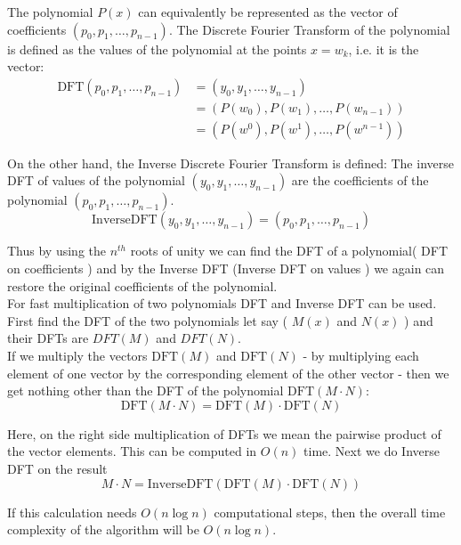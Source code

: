 \documentclass[28]{report}
\begin{document}
              The polynomial $P(x)$ can equivalently be represented as the vector of coefficients $(p_0, p_1, \dots, p_{n-1})$. The Discrete Fourier Transform of the polynomial is defined as the values of the polynomial at the points $x = w_{k}$, i.e. it is the vector: \\

                \begin{align*} \text{DFT}(p_0, p_1, \dots, p_{n-1}) &= (y_0, y_1, \dots, y_{n-1}) \\ &= (P(w_{0}), P(w_{1}), \dots, P(w_{n-1})) \\ &= (P(w^0), P(w^1), \dots, P(w^{n-1})) \end{align*}

            On the other hand,  the Inverse Discrete Fourier Transform is defined: The inverse DFT of values of the polynomial $(y_0, y_1, \dots, y_{n-1})$ are the coefficients of the polynomial $(p_0, p_1, \dots, p_{n-1})$.
            $$\text{InverseDFT}(y_0, y_1, \dots, y_{n-1}) = (p_0, p_1, \dots, p_{n-1})$$

            Thus by using the $n^{th}$ roots of unity we can find the DFT of a polynomial( DFT on coefficients ) and by the Inverse DFT (Inverse DFT on values ) we again can restore the original coefficients of the polynomial.
            \\
            
            For fast multiplication of two polynomials DFT and Inverse DFT can be used. First find the DFT of the two polynomials let say ( $M(x)$ and $N(x)$ ) and their DFTs are $ DFT(M)$ and $ DFT(N) $.\\
            

             If we multiply the vectors $\text{DFT}(M)$ and $\text{DFT}(N)$ - by multiplying each element of one vector by the corresponding element of the other vector - then we get nothing other than the DFT of the polynomial $\text{DFT}(M \cdot N)$:
            $$\text{DFT}(M \cdot N) = \text{DFT}(M) \cdot \text{DFT}(N)$$

            Here, on the right side multiplication of DFTs we mean the pairwise product of the vector elements. This can be computed in $O(n)$ time. Next we do Inverse DFT on the result\\
            $$M \cdot N = \text{InverseDFT}(\text{DFT}(M) \cdot \text{DFT}(N))$$

            If this calculation needs $O(n\log n)$ computational steps, then the overall time complexity of the algorithm will be $O(n\log n)$.
            
\end{document}
